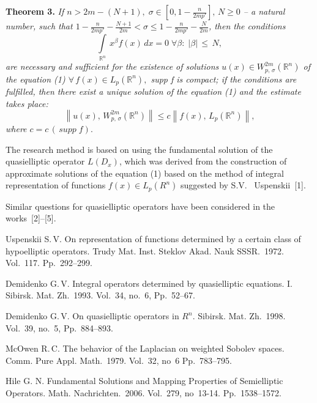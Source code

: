 \documentclass[12pt]{llncs}
\begin{document}
\textbf{Theorem 3.}
\textsl{If \(n > 2m - (N+1),\; \sigma \in [0, 1-\frac{n}{2mp'}],\, N \geq 0\) -- a natural number, such that \(1-\frac{n}{2mp'} - \frac{N+1}{2m} < \sigma \leq 1- \frac{n}{2mp'} - \frac{N}{2m}\), then the conditions 
\[\int\limits_{\mathbb{R}^n}\, x^{\beta} f(x) \,dx = 0\; \scriptstyle \forall \beta:\; |\beta| \,\leq\, N,\]
 are necessary and sufficient for the existence of solutions \(u(x) \in W^{2m}_{p, \,\sigma}(\mathbb{R}^n)\) of the equation (1) \(\forall\, f(x) \in L_p(\mathbb{R}^n),\) supp f is compact; if the conditions are fulfilled, then there exist a unique solution of the equation (1) and the estimate takes place: 
 \[\left\| u(x),\, W^{2m}_{p, \,\sigma}(\mathbb{R}^n)\right\| \leq c \left\|f(x),\, L_p(\mathbb{R}^n) \right\|,\]
 where \(c = c\,(\,supp\; f).\)}

The research method is based on using the fundamental solution of the
quasielliptic operator \(L(D_x)\), which was derived from the construction of approximate solutions of the equation (1) based on the method of integral representation of functions $f(x) \in L_p(R^n)$ suggested by S.V.~ Uspenskii~[1].

Similar questions for quasielliptic operators have been considered
in the works~[2]--[5].


\begin{thebibliography}{9} %

 Uspenskii S.\,V. On representation of functions determined by a certain class of hypoelliptic operators. Trudy Mat. Inst. Steklov Akad. Nauk SSSR.~1972. Vol.~117. Pp.~292--299.

 Demidenko G.\,V. Integral operators determined by quasielliptic equations. I.
Sibirsk. Mat. Zh.~1993. Vol.~34, no.~6, Pp.~52--67.

 Demidenko G.\,V. On quasielliptic operators in $R^n$.
Sibirsk. Mat. Zh.~1998. Vol.~39, no.~5, Pp.~884--893.

 McOwen R.\,C. The behavior of the Laplacian on weighted Sobolev spaces.
Comm. Pure Appl. Math.~1979. Vol.~32, no~6 Pp.~783--795.

 Hile G. N. Fundamental Solutions and Mapping Properties of Semielliptic Operators. 
Math. Nachrichten.~2006. Vol.~279, no~13-14. Pp.~1538--1572.

\end{thebibliography}

\end{document}
